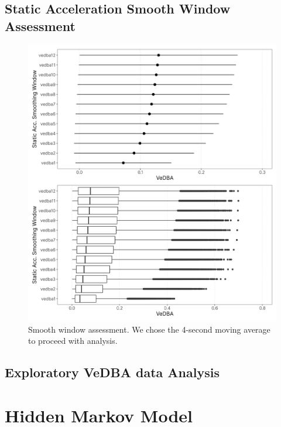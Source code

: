 \documentclass[english,msc,numbers,hidelinks]{coppe}
\begin{document}
  \hypertarget{static-acceleration-smooth-window-assessment}{%
  \section{Static Acceleration Smooth Window Assessment}\label{static-acceleration-smooth-window-assessment}}
  \begin{figure}

  {\centering \includegraphics[width=1\linewidth]{../04_figures/appendix/plot_smoothing_window} 

  }

  \caption{Smooth window assessment. We chose the 4-second moving average to proceed with analysis.}\label{fig:appendix-smooth-window}
  \end{figure}
  \hypertarget{exploratory-vedba-data-analysis}{%
  \section{Exploratory VeDBA data Analysis}\label{exploratory-vedba-data-analysis}}

  \hypertarget{hidden-markov-model}{%
  \chapter{Hidden Markov Model}\label{hidden-markov-model}}
\end{document}
